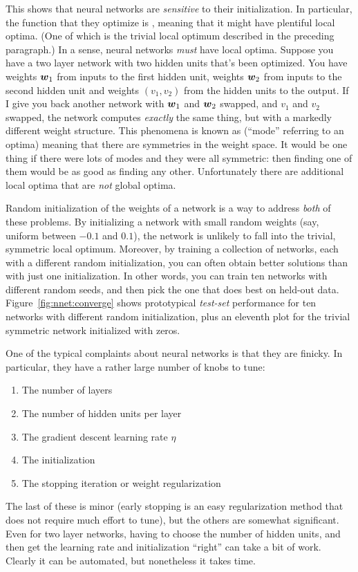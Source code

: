 This shows that neural networks are \emph{sensitive} to their
initialization.  In particular, the function that they optimize is
, meaning that it might have plentiful local
optima.  (One of which is the trivial local optimum described in the
preceding paragraph.)  In a sense, neural networks \emph{must} have
local optima.  Suppose you have a two layer network with two hidden
units that's been optimized.  You have weights ${\boldsymbol{w}}_1$ from inputs to
the first hidden unit, weights ${\boldsymbol{w}}_2$ from inputs to the second
hidden unit and weights $(v_1,v_2)$ from the hidden units to the
output.  If I give you back another network with ${\boldsymbol{w}}_1$ and ${\boldsymbol{w}}_2$
swapped, and $v_1$ and $v_2$ swapped, the network computes
\emph{exactly} the same thing, but with a markedly different weight
structure.  This phenomena is known as 
(``mode'' referring to an optima) meaning that there are symmetries in
the weight space.  It would be one thing if there were lots of modes
and they were all symmetric: then finding one of them would be as good
as finding any other.  Unfortunately there are additional local
optima that are \emph{not} global optima.


Random initialization of the weights of a network is a way to address
\emph{both} of these problems.  By initializing a network with small
random weights (say, uniform between $-0.1$ and $0.1$), the network is
unlikely to fall into the trivial, symmetric local optimum.  Moreover,
by training a collection of networks, each with a different random
initialization, you can often obtain better solutions than with just
one initialization.  In other words, you can train ten networks with
different random seeds, and then pick the one that does best on
held-out data.  Figure~\ref{fig:nnet:converge} shows prototypical
\emph{test-set} performance for ten networks with different random
initialization, plus an eleventh plot for the trivial symmetric
network initialized with zeros.

One of the typical complaints about neural networks is that they are
finicky.  In particular, they have a rather large number of knobs to
tune:
%
\begin{enumerate}
\item The number of layers
\item The number of hidden units per layer
\item The gradient descent learning rate $\eta$
\item The initialization
\item The stopping iteration or weight regularization
\end{enumerate}
%
The last of these is minor (early stopping is an easy regularization
method that does not require much effort to tune), but the others are
somewhat significant.  Even for two layer networks, having to choose
the number of hidden units, and then get the learning rate and
initialization ``right'' can take a bit of work.  Clearly it can be
automated, but nonetheless it takes time.

